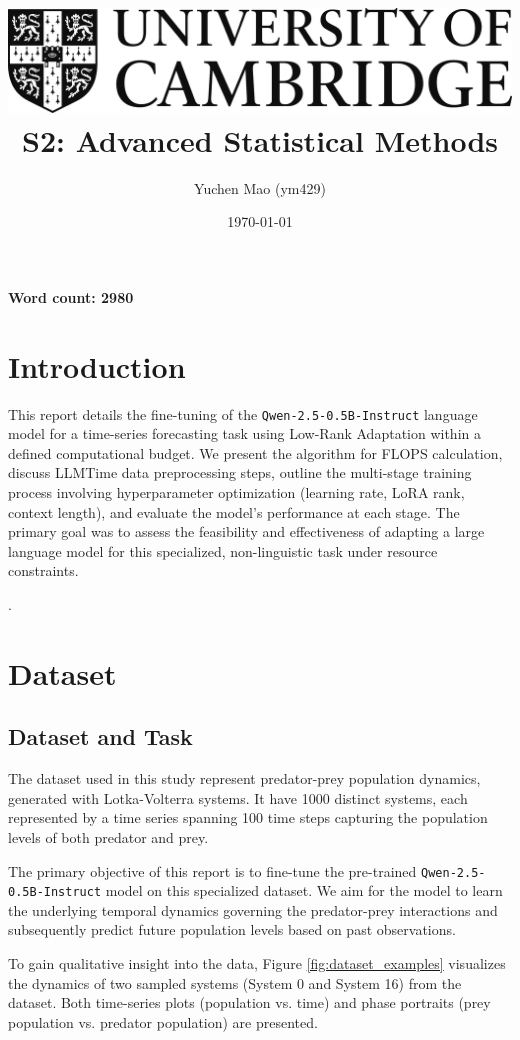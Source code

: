 \documentclass{article}
\title{
    \includegraphics[scale=0.2]{Images/cam_logo_bw.png}\\ %
    \vspace{0.5cm}
    S2: Advanced Statistical Methods
}
\author{Yuchen Mao (ym429)}
\affil{Department of Physics, University of Cambridge}
\date{\today}
\begin{document}
\maketitle
\noindent\textbf{Word count: 2980}

\tableofcontents
\newpage


\section{Introduction}
This report details the fine-tuning of the \texttt{Qwen-2.5-0.5B-Instruct} language model for a time-series forecasting task using Low-Rank Adaptation within a defined computational budget. We present the algorithm for FLOPS calculation, discuss LLMTime data preprocessing steps, outline the multi-stage training process involving hyperparameter optimization (learning rate, LoRA rank, context length), and evaluate the model's performance at each stage. The primary goal was to assess the feasibility and effectiveness of adapting a large language model for this specialized, non-linguistic task under resource constraints.

.


\section{Dataset}

\subsection{Dataset and Task} %

The dataset used in this study represent predator-prey population dynamics, generated with Lotka-Volterra systems. It have 1000 distinct systems, each represented by a time series spanning 100 time steps capturing the population levels of both predator and prey. 

The primary objective of this report is to fine-tune the pre-trained \texttt{Qwen-2.5-0.5B-Instruct} model on this specialized dataset. We aim for the model to learn the underlying temporal dynamics governing the predator-prey interactions and subsequently predict future population levels based on past observations.

To gain qualitative insight into the data, Figure \ref{fig:dataset_examples} visualizes the dynamics of two sampled systems (System 0 and System 16) from the dataset. Both time-series plots (population vs. time) and phase portraits (prey population vs. predator population) are presented.
\end{document}
